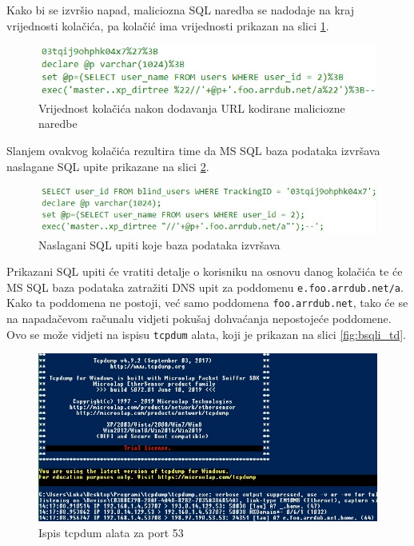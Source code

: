 \documentclass[12pt, oneside, onecolumn]{book}
\begin{document}
{Kako bi se izvršio napad, maliciozna SQL naredba se nadodaje na kraj vrijednosti kolačića, pa kolačić ima vrijednosti prikazan na slici \ref{fig:bsqli_mpay}.

\begin{figure}[H]
	\begin{center}
		\includegraphics[width=\textwidth]{bsqli_mpay.jpg}
		\caption{Vrijednost kolačića nakon dodavanja URL kodirane maliciozne naredbe} \label{fig:bsqli_mpay}
	\end{center}
\end{figure}

Slanjem ovakvog kolačića rezultira time da MS SQL baza podataka izvršava naslagane SQL upite prikazane na slici \ref{fig:bsqli_fsql}.

\begin{figure}[H]
	\begin{center}
		\includegraphics[width=\textwidth]{bsqli_fsql.jpg}
		\caption{Naslagani SQL upiti koje baza podataka izvršava} \label{fig:bsqli_fsql}
	\end{center}
\end{figure}

Prikazani SQL upiti će vratiti detalje o korisniku na osnovu danog kolačića te će MS SQL baza podataka zatražiti DNS upit za poddomenu \texttt{e.foo.arrdub.net/a}. Kako ta poddomena ne postoji, već samo poddomena \texttt{foo.arrdub.net}, tako će se na napadačevom računalu vidjeti pokušaj dohvaćanja nepostojeće poddomene. Ovo se može vidjeti na ispisu \texttt{tcpdum} alata, koji je prikazan na slici \ref{fig:bsqli_td}.

\begin{figure}[H]
	\begin{center}
		\includegraphics[width=\textwidth]{bsql_td.jpg}
		\caption{Ispis tcpdum alata za port 53} \label{fig:bsql_td}
	\end{center}
\end{figure}

}
\end{document}
